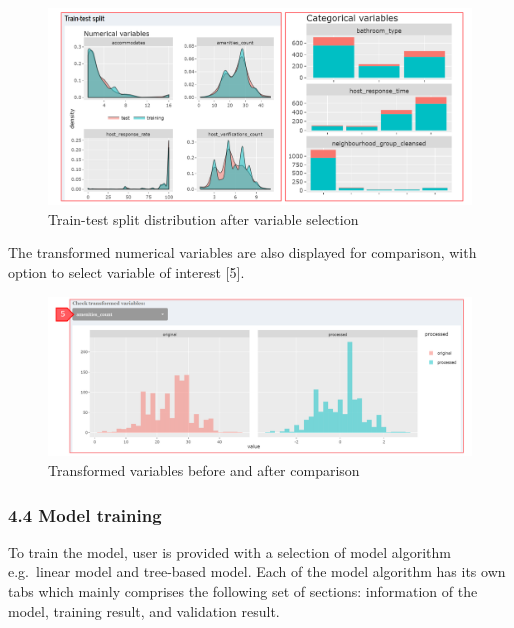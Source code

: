 \documentclass[
  12pt,
]{article}
\begin{document}
\begin{figure}[H]

{\centering \includegraphics[width=0.95\linewidth]{images/datatrf2} 

}

\caption{Train-test split distribution after variable selection}\label{fig:unnamed-chunk-23}
\end{figure}

The transformed numerical variables are also displayed for comparison,
with option to select variable of interest {[}5{]}.

\begin{figure}[H]

{\centering \includegraphics[width=0.95\linewidth]{images/datatrf3} 

}

\caption{Transformed variables before and after comparison}\label{fig:unnamed-chunk-24}
\end{figure}

\hypertarget{model-training}{%
\subsubsection{4.4 Model training}\label{model-training}}

To train the model, user is provided with a selection of model algorithm
e.g.~linear model and tree-based model. Each of the model algorithm has
its own tabs which mainly comprises the following set of sections:
information of the model, training result, and validation result.
\end{document}
